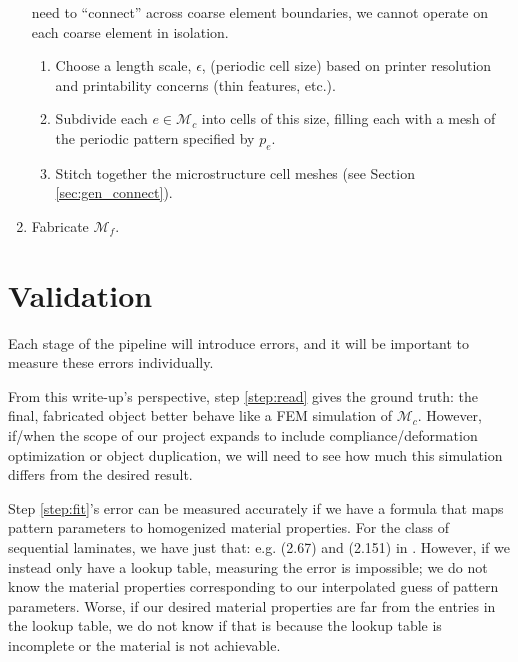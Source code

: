 \documentclass[10pt]{article}
\providecommand{\mesh}{\mathcal{M}}
\begin{document}
\begin{enumerate}
        need to ``connect'' across coarse element boundaries, we cannot operate
        on each coarse element in isolation.
        \label{step:mesh}
        \begin{enumerate}
            \item Choose a length scale, $\epsilon$, (periodic cell size) based
                on printer resolution and printability concerns (thin features,
                etc.).
            \item Subdivide each $e \in \mesh_c$ into cells of this size,
                filling each with a mesh of the periodic pattern specified by
                $p_e$.
            \item Stitch together the microstructure cell meshes (see Section
                \ref{sec:gen_connect}).
        \end{enumerate}
    \item Fabricate $\mesh_f$.
    \label{step:fabricate}
\end{enumerate}

\section{Validation}
Each stage of the pipeline will introduce errors, and it will be important to
measure these errors individually.

From this write-up's perspective, step \ref{step:read} gives the ground truth:
the final, fabricated object better behave like a FEM simulation of $\mesh_c$.
However, if/when the scope of our project expands to include
compliance/deformation optimization or object duplication, we will need to see
how much this simulation differs from the desired result.

Step \ref{step:fit}'s error can be measured accurately if we have a formula
that maps pattern parameters to homogenized material properties. For the class
of sequential laminates, we have just that: e.g. (2.67) and (2.151) in
\cite{allaire2002shape}. However, if we instead only have a lookup table,
measuring the error is impossible; we do not know the material properties
corresponding to our interpolated guess of pattern parameters. Worse, if our
desired material properties are far from the entries in the lookup table, we do
not know if that is because the lookup table is incomplete or the material is
not achievable.
\end{document}
